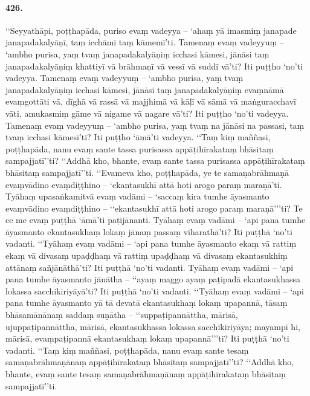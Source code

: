 \paragraph{426.} ‘‘Seyyathāpi, poṭṭhapāda, puriso evaṃ vadeyya – ‘ahaṃ yā imasmiṃ janapade janapadakalyāṇī, taṃ icchāmi taṃ kāmemī’ti. Tamenaṃ evaṃ vadeyyuṃ – ‘ambho purisa, yaṃ tvaṃ janapadakalyāṇiṃ icchasi kāmesi, jānāsi taṃ janapadakalyāṇiṃ khattiyī vā brāhmaṇī vā vessī vā suddī vā’ti? Iti puṭṭho ‘no’ti vadeyya. Tamenaṃ evaṃ vadeyyuṃ – ‘ambho purisa, yaṃ tvaṃ janapadakalyāṇiṃ icchasi kāmesi, jānāsi taṃ janapadakalyāṇiṃ evaṃnāmā evaṃgottāti vā, dīghā vā rassā vā majjhimā vā kāḷī vā sāmā vā maṅguracchavī vāti, amukasmiṃ gāme vā nigame vā nagare vā’ti? Iti puṭṭho ‘no’ti vadeyya. Tamenaṃ evaṃ vadeyyuṃ – ‘ambho purisa, yaṃ tvaṃ na jānāsi na passasi, taṃ tvaṃ icchasi kāmesī’ti? Iti puṭṭho ‘āmā’ti vadeyya. ‘‘Taṃ kiṃ maññasi, poṭṭhapāda, nanu evaṃ sante tassa purisassa appāṭihīrakataṃ bhāsitaṃ sampajjatī’’ti? ‘‘Addhā kho, bhante, evaṃ sante tassa purisassa appāṭihīrakataṃ bhāsitaṃ sampajjatī’’ti. ‘‘Evameva kho, poṭṭhapāda, ye te samaṇabrāhmaṇā evaṃvādino evaṃdiṭṭhino – ‘ekantasukhī attā hoti arogo paraṃ maraṇā’ti. Tyāhaṃ upasaṅkamitvā evaṃ vadāmi – ‘saccaṃ kira tumhe āyasmanto evaṃvādino evaṃdiṭṭhino – ‘‘ekantasukhī attā hoti arogo paraṃ maraṇā’’’ti? Te ce me evaṃ puṭṭhā ‘āmā’ti paṭijānanti. Tyāhaṃ evaṃ vadāmi – ‘api pana tumhe āyasmanto ekantasukhaṃ lokaṃ jānaṃ passaṃ viharathā’ti? Iti puṭṭhā ‘no’ti vadanti. ‘‘Tyāhaṃ evaṃ vadāmi – ‘api pana tumhe āyasmanto ekaṃ vā rattiṃ ekaṃ vā divasaṃ upaḍḍhaṃ vā rattiṃ upaḍḍhaṃ vā divasaṃ ekantasukhiṃ attānaṃ sañjānāthā’ti? Iti puṭṭhā ‘no’ti vadanti. Tyāhaṃ evaṃ vadāmi – ‘api pana tumhe āyasmanto jānātha – ‘‘ayaṃ maggo ayaṃ paṭipadā ekantasukhassa lokassa sacchikiriyāyā’ti? Iti puṭṭhā ‘no’ti vadanti. ‘‘Tyāhaṃ evaṃ vadāmi – ‘api pana tumhe āyasmanto yā tā devatā ekantasukhaṃ lokaṃ upapannā, tāsaṃ bhāsamānānaṃ saddaṃ suṇātha – ‘‘suppaṭipannāttha, mārisā, ujuppaṭipannāttha, mārisā, ekantasukhassa lokassa sacchikiriyāya; mayampi hi, mārisā, evaṃpaṭipannā ekantasukhaṃ lokaṃ upapannā’’’ti? Iti puṭṭhā ‘no’ti vadanti. ‘‘Taṃ kiṃ maññasi, poṭṭhapāda, nanu evaṃ sante tesaṃ samaṇabrāhmaṇānaṃ appāṭihīrakataṃ bhāsitaṃ sampajjatī’’ti? ‘‘Addhā kho, bhante, evaṃ sante tesaṃ samaṇabrāhmaṇānaṃ appāṭihīrakataṃ bhāsitaṃ sampajjatī’’ti.

